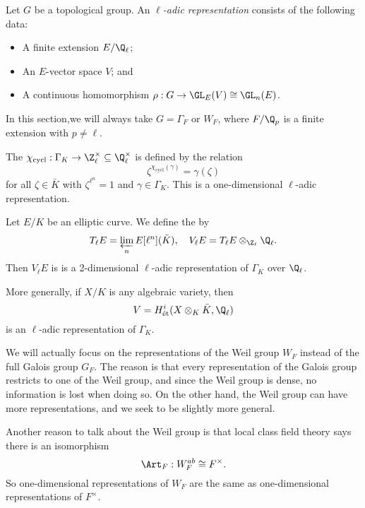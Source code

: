 \documentclass[a4paper]{article}
\begin{document}
\begin{defi}
  Let $G$ be a topological group. An \emph{$\ell$-adic representation} consists of the following data:
  \begin{itemize}
    \item A finite extension $E/\Q_{\ell}$;
    \item An $E$-vector space $V$; and
    \item A continuous homomorphism $\rho: G \to \GL_E(V) \cong \GL_n(E)$.
  \end{itemize}
\end{defi}

In this section,we will always take $G = \Gamma_F$ or $W_F$, where $F/\Q_p$ is a finite extension with $p \not= \ell$.
\begin{eg}
  The  $\chi_{\mathrm{cycl}}: \Gamma_K \to \Z_\ell^\times \subseteq \Q_\ell^\times$ is defined by the relation
  \[
    \zeta^{\chi_{\mathrm{cycl}}(\gamma)} = \gamma(\zeta)
  \]
  for all $\zeta \in \bar{K}$ with $\zeta^{\ell^n} = 1$ and $\gamma \in \Gamma_K$. This is a one-dimensional $\ell$-adic representation.
\end{eg}

\begin{eg}
  Let $E/K$ be an elliptic curve. We define the  by
  \[
    T_\ell E = \varprojlim_n E[\ell^n](\bar{K}),\quad V_\ell E = T_\ell E \otimes_{\Z_\ell} \Q_{\ell}.
  \]
  Then $V_\ell E$ is is a 2-dimensional $\ell$-adic representation of $\Gamma_K$ over $\Q_\ell$.
\end{eg}

\begin{eg}
  More generally, if $X/K$ is any algebraic variety, then
  \[
    V = H^i_{\text{\'et}}(X \otimes_K \bar{K}, \Q_\ell)
  \]
  is an $\ell$-adic representation of $\Gamma_K$.
\end{eg}

We will actually focus on the representations of the Weil group $W_F$ instead of the full Galois group $G_F$. The reason is that every representation of the Galois group restricts to one of the Weil group, and since the Weil group is dense, no information is lost when doing so. On the other hand, the Weil group can have more representations, and we seek to be slightly more general.

Another reason to talk about the Weil group is that local class field theory says there is an isomorphism
\[
  \Art_F: W_F^{ab} \cong F^\times.
\]
So one-dimensional representations of $W_F$ are the same as one-dimensional representations of $F^\times$.%
\end{document}

